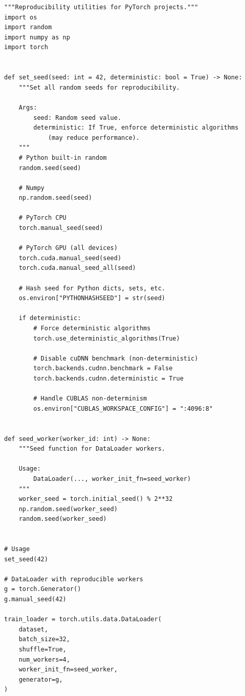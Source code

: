\begin{codeblock}[title=\textbf{Configuration compl\`ete de reproductibilit\'e}]
\begin{verbatim}
"""Reproducibility utilities for PyTorch projects."""
import os
import random
import numpy as np
import torch


def set_seed(seed: int = 42, deterministic: bool = True) -> None:
    """Set all random seeds for reproducibility.

    Args:
        seed: Random seed value.
        deterministic: If True, enforce deterministic algorithms
            (may reduce performance).
    """
    # Python built-in random
    random.seed(seed)

    # Numpy
    np.random.seed(seed)

    # PyTorch CPU
    torch.manual_seed(seed)

    # PyTorch GPU (all devices)
    torch.cuda.manual_seed(seed)
    torch.cuda.manual_seed_all(seed)

    # Hash seed for Python dicts, sets, etc.
    os.environ["PYTHONHASHSEED"] = str(seed)

    if deterministic:
        # Force deterministic algorithms
        torch.use_deterministic_algorithms(True)

        # Disable cuDNN benchmark (non-deterministic)
        torch.backends.cudnn.benchmark = False
        torch.backends.cudnn.deterministic = True

        # Handle CUBLAS non-determinism
        os.environ["CUBLAS_WORKSPACE_CONFIG"] = ":4096:8"


def seed_worker(worker_id: int) -> None:
    """Seed function for DataLoader workers.

    Usage:
        DataLoader(..., worker_init_fn=seed_worker)
    """
    worker_seed = torch.initial_seed() % 2**32
    np.random.seed(worker_seed)
    random.seed(worker_seed)


# Usage
set_seed(42)

# DataLoader with reproducible workers
g = torch.Generator()
g.manual_seed(42)

train_loader = torch.utils.data.DataLoader(
    dataset,
    batch_size=32,
    shuffle=True,
    num_workers=4,
    worker_init_fn=seed_worker,
    generator=g,
)
\end{verbatim}
\end{codeblock}

